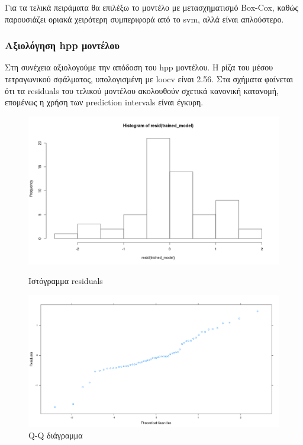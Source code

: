 \documentclass[]{article}
\numberwithin{equation}{section}		%
\numberwithin{figure}{section}			%
\numberwithin{table}{section}				%
\begin{document}
   Για τα τελικά πειράματα θα επιλέξω το μοντέλο με μετασχηματισμό Box-Cox, καθώς παρουσιάζει οριακά χειρότερη συμπεριφορά από το svm, αλλά είναι απλούστερο.
   
     
   \subsubsection{Αξιολόγηση \gls{hpp} μοντέλου}
   
   Στη συνέχεια αξιολογούμε την απόδοση του \gls{hpp} μοντέλου. Η ρίζα του μέσου τετραγωνικού σφάλματος, υπολογισμένη με \gls{loocv} είναι 2.56. Στα σχήματα φαίνεται ότι τα residuals του τελικού μοντέλου ακολουθούν σχετικά κανονική κατανομή, επομένως η χρήση των prediction intervals είναι έγκυρη.
   
   \begin{figure}[!htb]
   	\centering
   	\begin{minipage}{.5\textwidth}
   		\centering
   		\includegraphics[width=\linewidth, height=0.2\textheight]{hist_resid}
   		\caption{Ιστόγραμμα residuals}
   		\label{fig:1}
   	\end{minipage}%
   	\begin{minipage}{0.5\textwidth}
   		\centering
   		\includegraphics[width=\linewidth, height=0.2\textheight]{lm_trans_resid_qq}
   		\caption{Q-Q διάγραμμα}
   		\label{fig: 2}
   	\end{minipage}
   \end{figure}
   
\end{document}
